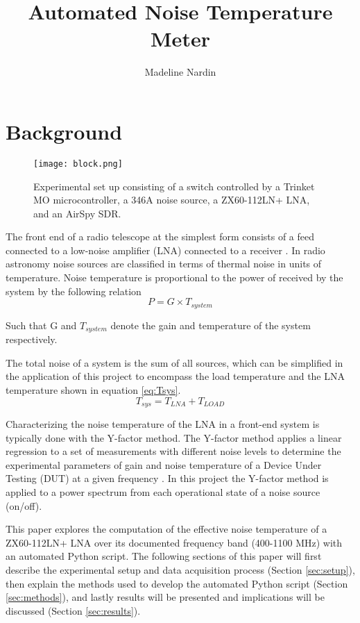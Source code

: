 \documentclass[twocolumn]{aastex631}
\begin{document}
\title{Automated Noise Temperature Meter}
\author{Madeline Nardin}
\hfill

\section{Background} \label{sec:intro}
\begin{figure*}[ht!]
 \center
  \texttt{[image: block.png]}
  \caption{Experimental set up consisting of a switch controlled by a Trinket MO microcontroller, a 346A noise source, a ZX60-112LN+ LNA, and an AirSpy SDR.}
  \label{fig:block}
\end{figure*}
The front end of a radio telescope at the simplest form consists of a feed connected to a low-noise amplifier (LNA) connected to a receiver \citep{gary_2019}. In radio astronomy noise sources are classified in terms of thermal noise in units of temperature. Noise temperature is proportional to the power of received by the system by the following relation
\begin{equation}\label{eq:p_sys}
P  = G\times T_{system}
\end{equation}
\begin{center}
Such that G and $ T_{system}$ denote the gain and temperature of the system respectively.
\end{center}

The total noise of a system is the sum of all sources, which can be simplified in the application of this project to encompass the load temperature and the LNA temperature shown in equation \ref{eq:Tsys}.
\begin{equation}\label{eq:Tsys}
T_{sys} = T_{LNA} + T_{LOAD}
\end{equation}

Characterizing the noise temperature of the LNA in a front-end system is typically done with the Y-factor method. The Y-factor method applies a linear regression to a set of measurements with different noise levels to determine the experimental parameters of gain and noise temperature of a Device Under Testing (DUT) at a given frequency \citep{agilent_technologies}. In this project the Y-factor method is applied to a power spectrum from each operational state of a noise source (on/off). 

This paper explores the computation of the effective noise temperature of a ZX60-112LN+ LNA over its documented frequency band (400-1100 MHz) with an automated Python script. The following sections of this paper will first describe the experimental setup and data acquisition process (Section \ref{sec:setup}), then explain the methods used to develop the automated Python script (Section \ref{sec:methods}), and lastly  results will be presented and implications will be discussed  (Section \ref{sec:results}). 
\end{document}
